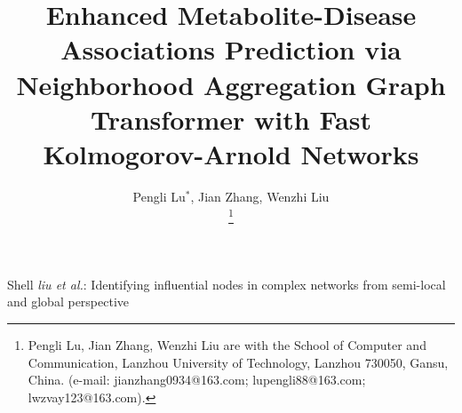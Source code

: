 \documentclass[lettersize,journal]{IEEEtran}
\begin{document}
\title{Enhanced Metabolite-Disease Associations Prediction via Neighborhood Aggregation Graph Transformer with Fast Kolmogorov-Arnold Networks}

\author{Pengli Lu$^{\ast}$, Jian Zhang, Wenzhi Liu

\thanks{
Pengli Lu, Jian Zhang, Wenzhi Liu are with the School of Computer and Communication, Lanzhou University of Technology, Lanzhou 730050, Gansu, China. (e-mail: jianzhang0934@163.com; lupengli88@163.com; lwzvay123@163.com).
}}

%
{Shell \MakeLowercase{\textit{Liu et al.}}: Identifying influential nodes in complex networks
from semi-local and global perspective}


\maketitle
\end{document}
